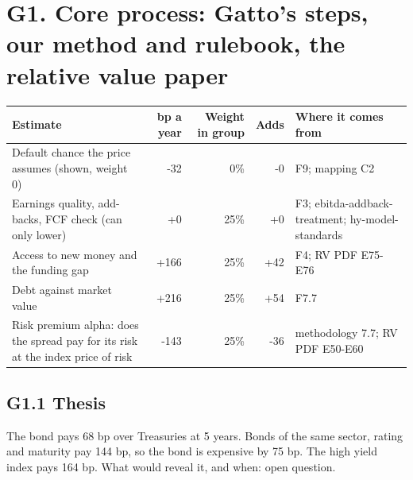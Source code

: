 \documentclass[11pt,a4paper]{article}
\begin{document}
\section*{G1. Core process: Gatto's steps, our method and rulebook, the relative value paper}
\par\noindent{}
\begin{center}\footnotesize\setlength{\tabcolsep}{3.5pt}\begin{tabular}{@{}p{6.2cm}rrrp{4.2cm}@{}}\toprule
Estimate & bp a year & Weight in group & Adds & Where it comes from \\\midrule
Default chance the price assumes (shown, weight 0) & -32 & 0\% & -0 & F9; mapping C2 \\
Earnings quality, add-backs, FCF check (can only lower) & +0 & 25\% & +0 & F3; ebitda-addback-treatment; hy-model-standards \\
Access to new money and the funding gap & +166 & 25\% & +42 & F4; RV PDF E75-E76 \\
Debt against market value & +216 & 25\% & +54 & F7.7 \\
Risk premium alpha: does the spread pay for its risk at the index price of risk & -143 & 25\% & -36 & methodology 7.7; RV PDF E50-E60 \\
\bottomrule\end{tabular}\end{center}
\subsection*{G1.1 Thesis}
The bond pays 68 bp over Treasuries at 5 years. Bonds of the same sector, rating and maturity pay 144 bp, so the bond is expensive by 75 bp. The high yield index pays 164 bp. What would reveal it, and when: open question.
\end{document}
